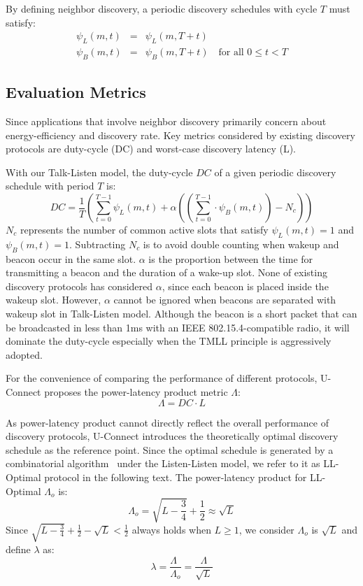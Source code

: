 \documentclass[conference]{IEEEtran}
\begin{document}
By defining neighbor discovery, a periodic discovery schedules with cycle $T$ must satisfy:
\begin{eqnarray}
    \psi_L (m,t) & = & \psi_L (m,T+t) \nonumber \\
    \psi_B (m,t) & = & \psi_B (m,T+t) \quad \textrm{for all $0 \leq t < T$}
\end{eqnarray}

\subsection{Evaluation Metrics}

Since applications that involve neighbor discovery primarily concern about energy-efficiency and discovery rate.
Key metrics considered by existing discovery protocols are duty-cycle (DC) and worst-case discovery latency (L).

With our Talk-Listen model, the duty-cycle $DC$ of a given periodic discovery schedule with period $T$ is:
\begin{displaymath}
    DC = \frac{1}{T} ( \sum_{t=0}^{T-1} \psi_L(m,t) + \alpha ((\sum_{t=0}^{T-1} \cdot \psi_B(m, t)) - N_c) )
\end{displaymath}
$N_c$ represents the number of common active slots that satisfy $\psi_L(m,t)=1$ and $\psi_B(m,t)=1$.
Subtracting $N_c$ is to avoid double counting when wakeup and beacon occur in the same slot.
$\alpha$ is the proportion between the time for transmitting a beacon and the duration of a wake-up slot.
None of existing discovery protocols has considered $\alpha$, since each beacon is placed inside the wakeup slot.
However, $\alpha$ cannot be ignored when beacons are separated with wakeup slot in Talk-Listen model.
Although the beacon is a short packet that can be broadcasted in less than 1ms with an IEEE 802.15.4-compatible radio,
it will dominate the duty-cycle especially when the TMLL principle is aggressively adopted.

For the convenience of comparing the performance of different protocols, U-Connect proposes the power-latency product metric $\Lambda$:
\begin{displaymath}
    \Lambda = DC \cdot L
\end{displaymath}

As power-latency product cannot directly reflect the overall performance of discovery protocols,
U-Connect introduces the theoretically optimal discovery schedule as the reference point.
Since the optimal schedule is generated by a combinatorial algorithm~\cite{zheng2003asynchronous} under the Listen-Listen model,
we refer to it as LL-Optimal protocol in the following text.
The power-latency product for LL-Optimal $\Lambda_o$ is:
\begin{displaymath}
    \Lambda_o = \sqrt{L-\frac{3}{4}} + \frac{1}{2} \approx \sqrt{L}
\end{displaymath}
Since $\sqrt{L-\frac{3}{4}} + \frac{1}{2} - \sqrt{L} < \frac{1}{2}$ always holds when $L \geq 1$,
we consider $\Lambda_o$ is $\sqrt{L}$ and define $\lambda$ as:
\begin{displaymath}
    \lambda = \frac{\Lambda_{\phantom{1}}}{\Lambda_o} = \frac{\Lambda}{\sqrt{L}}
\end{displaymath}
\end{document}
